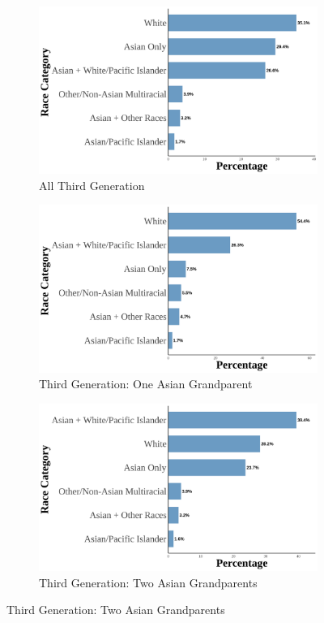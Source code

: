 \begin{landscape}
\begin{figure}[!htb]
\centering
\caption{Asian Racial Identity: Third Generation}
\label{fig:histogram-thirdgen}

\begin{subfigure}{.32\textwidth}
\caption{All Third Generation}
\centering
\includegraphics[width=1\linewidth]{histogram_asian_american_race_thirdgen.png}
\end{subfigure}
\hfill
\begin{subfigure}{.32\textwidth}
\caption{Third Generation: One Asian Grandparent}
\centering
\includegraphics[width=1\linewidth]{histogram_asian_american_race_thirdgen_oneasiangran.png}
\end{subfigure}
\hfill
\begin{subfigure}{.32\textwidth}
\caption{Third Generation: Two Asian Grandparents}
\centering
\includegraphics[width=1\linewidth]{histogram_asian_american_race_thirdgen_twoasiangran.png}

\end{subfigure}
\end{figure}
\end{landscape}
